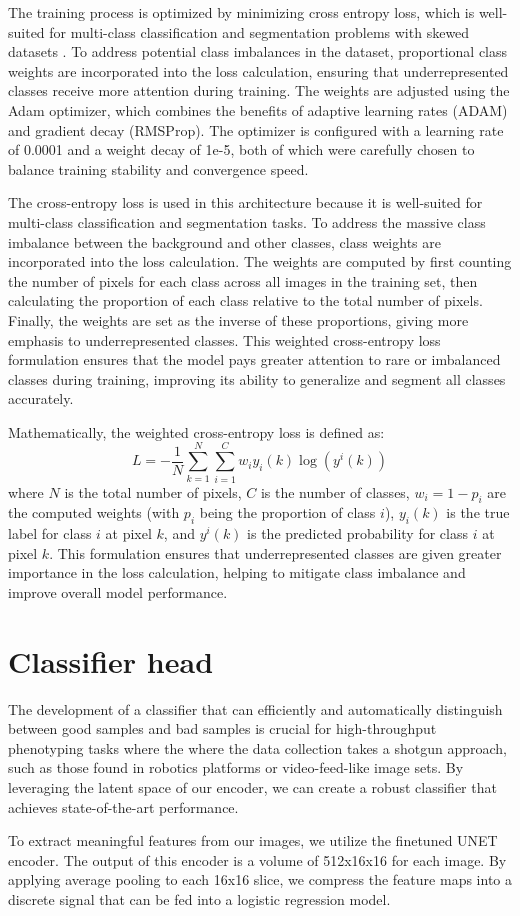 The training process is optimized by minimizing cross entropy loss, which is well-suited for multi-class classification and segmentation problems with skewed datasets \cite{Jadon2020}. To address potential class imbalances in the dataset, proportional class weights are incorporated into the loss calculation, ensuring that underrepresented classes receive more attention during training. The weights are adjusted using the Adam optimizer, which combines the benefits of adaptive learning rates (ADAM) and gradient decay (RMSProp). The optimizer is configured with a learning rate of 0.0001 and a weight decay of 1e-5, both of which were carefully chosen to balance training stability and convergence speed. 

The cross-entropy loss is used in this architecture because it is well-suited for multi-class classification and segmentation tasks. To address the massive class imbalance between the background and other classes, class weights are incorporated into the loss calculation. The weights are computed by first counting the number of pixels for each class across all images in the training set, then calculating the proportion of each class relative to the total number of pixels. Finally, the weights are set as the inverse of these proportions, giving more emphasis to underrepresented classes. This weighted cross-entropy loss formulation ensures that the model pays greater attention to rare or imbalanced classes during training, improving its ability to generalize and segment all classes accurately.

Mathematically, the weighted cross-entropy loss is defined as:
\[
L = -\frac{1}{N} \sum_{k=1}^N \sum_{i=1}^{C} w_i y_i(k) \log(y^i(k))
\]
where $N$ is the total number of pixels, $C$ is the number of classes, $w_i = 1 - p_i$ are the computed weights (with $p_i$ being the proportion of class $i$), $y_i(k)$ is the true label for class $i$ at pixel $k$, and $y^i(k)$ is the predicted probability for class $i$ at pixel $k$. This formulation ensures that underrepresented classes are given greater importance in the loss calculation, helping to mitigate class imbalance and improve overall model performance. 

\section{Classifier head}
The development of a classifier that can efficiently and automatically distinguish between good samples and bad samples is crucial for high-throughput phenotyping tasks where the where the data collection takes a shotgun approach, such as those found in robotics platforms or video-feed-like image sets. By leveraging the latent space of our encoder, we can create a robust classifier that achieves state-of-the-art performance.

To extract meaningful features from our images, we utilize the finetuned UNET encoder. The output of this encoder is a volume of 512x16x16 for each image. By applying average pooling to each 16x16 slice, we compress the feature maps into a discrete signal that can be fed into a logistic regression model.

